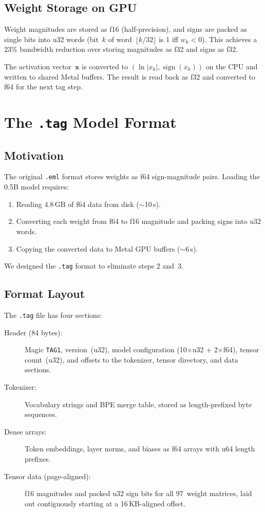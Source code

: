 \documentclass[acmsmall,nonacm]{acmart}
\begin{document}
\subsection{Weight Storage on GPU}

Weight magnitudes are stored as f16 (half-precision), and signs
are packed as single bits into u32 words (bit~$k$ of word~$\lfloor k/32 \rfloor$
is 1 iff $w_k < 0$).  This achieves a 23\% bandwidth reduction
over storing magnitudes as f32 and signs as f32.

The activation vector~$\mathbf{x}$ is converted to
$(\ln|x_k|, \operatorname{sign}(x_k))$ on the CPU and written to
shared Metal buffers.  The result is read back as f32 and
converted to f64 for the next tag step.


\section{The \texttt{.tag} Model Format}
\label{sec:format}

\subsection{Motivation}

The original \texttt{.eml} format stores weights as f64
sign-magnitude pairs.  Loading the 0.5B model requires:
\begin{enumerate}
\item Reading 4.8\,GB of f64 data from disk (\(\sim\)10\,s).
\item Converting each weight from f64 to f16 magnitude and
  packing signs into u32 words.
\item Copying the converted data to Metal GPU buffers
  (\(\sim\)6\,s).
\end{enumerate}

We designed the \texttt{.tag} format to eliminate steps 2 and~3.

\subsection{Format Layout}

The \texttt{.tag} file has four sections:

\begin{description}
\item[Header (84 bytes):] Magic \texttt{TAG1}, version~(u32),
  model configuration (10$\times$u32 + 2$\times$f64),
  tensor count~(u32), and offsets to the tokenizer, tensor
  directory, and data sections.

\item[Tokenizer:] Vocabulary strings and BPE merge table, stored
  as length-prefixed byte sequences.

\item[Dense arrays:] Token embeddings, layer norms, and biases
  as f64 arrays with u64 length prefixes.

\item[Tensor data (page-aligned):] f16 magnitudes and packed u32
  sign bits for all 97~weight matrices, laid out contiguously
  starting at a 16\,KB-aligned offset.
\end{description}
\end{document}
